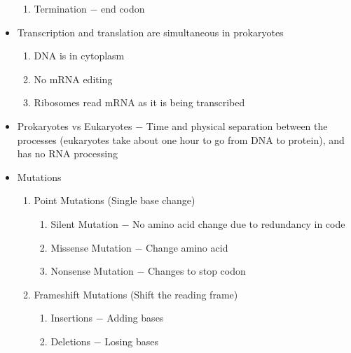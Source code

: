 \documentclass[12pt]{article}
\begin{document}
\begin{itemize}
\begin{enumerate}
    \item Termination $-$ end codon

  \end{enumerate}

\item Transcription and translation are simultaneous in prokaryotes

  \begin{enumerate}

    \item DNA is in cytoplasm

    \item No mRNA editing

    \item Ribosomes read mRNA as it is being transcribed

  \end{enumerate}

\item Prokaryotes vs Eukaryotes $-$ Time and physical separation between the processes (eukaryotes take about one hour to go from DNA to protein), and has no RNA processing

\item Mutations

  \begin{enumerate}

    \item Point Mutations (Single base change)

      \begin{enumerate}

        \item Silent Mutation $-$ No amino acid change due to redundancy in code

        \item Missense Mutation $-$ Change amino acid

        \item Nonsense Mutation $-$ Changes to stop codon

      \end{enumerate}

    \item Frameshift Mutations (Shift the reading frame)

      \begin{enumerate}

        \item Insertions $-$ Adding bases

        \item Deletions $-$ Losing bases


\end{enumerate}
\end{enumerate}
\end{itemize}
\end{document}
